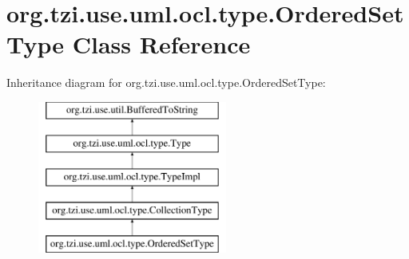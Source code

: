 \hypertarget{classorg_1_1tzi_1_1use_1_1uml_1_1ocl_1_1type_1_1_ordered_set_type}{\section{org.\-tzi.\-use.\-uml.\-ocl.\-type.\-Ordered\-Set\-Type Class Reference}
\label{classorg_1_1tzi_1_1use_1_1uml_1_1ocl_1_1type_1_1_ordered_set_type}
}
Inheritance diagram for org.\-tzi.\-use.\-uml.\-ocl.\-type.\-Ordered\-Set\-Type\-:\begin{figure}[H]
\begin{center}
\leavevmode
\includegraphics[height=5.000000cm]{classorg_1_1tzi_1_1use_1_1uml_1_1ocl_1_1type_1_1_ordered_set_type}
\end{center}
\end{figure}
